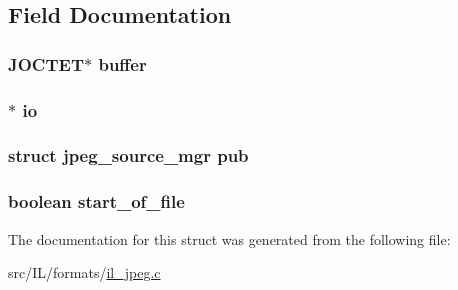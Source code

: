 \subsection{Field Documentation}
\hypertarget{structiread__mgr_ab52519326423db6890165ce4f4d3d818}{
\subsubsection[{buffer}]{\setlength{\rightskip}{0pt plus 5cm}J\-O\-C\-T\-E\-T$\ast$ buffer}}\label{structiread__mgr_ab52519326423db6890165ce4f4d3d818}
\hypertarget{structiread__mgr_ab6115e5993ca62edfb3a32ef981294c5}{
\subsubsection[{io}]{$\ast$ io}}\label{structiread__mgr_ab6115e5993ca62edfb3a32ef981294c5}
\hypertarget{structiread__mgr_a08cd767bebf8cecc3d859191d67a4955}{
\subsubsection[{pub}]{\setlength{\rightskip}{0pt plus 5cm}struct jpeg\-\_\-source\-\_\-mgr pub}}\label{structiread__mgr_a08cd767bebf8cecc3d859191d67a4955}
\hypertarget{structiread__mgr_a34ad202f834df4cfab94b6d7532b737a}{
\subsubsection[{start\-\_\-of\-\_\-file}]{\setlength{\rightskip}{0pt plus 5cm}boolean start\-\_\-of\-\_\-file}}\label{structiread__mgr_a34ad202f834df4cfab94b6d7532b737a}


The documentation for this struct was generated from the following file\-:\begin{DoxyCompactItemize}
\item 
src/\-I\-L/formats/\hyperlink{il__jpeg_8c}{il\-\_\-jpeg.\-c}\end{DoxyCompactItemize}
